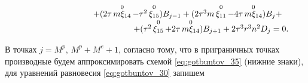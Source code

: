 \begin{equation}
\begin{array}{l}
\hspace{3cm}

+

(2\tau\mathop{m\xi_{14}}\limits^{0}-\tau^2\mathop{\xi_{15}}\limits^{0})B_{j-1}+

(2\tau^3m\mathop{\xi_{11}}\limits^{0}-4\tau\mathop{m\xi_{14}}\limits^{0})B_{j}+

\\

\hspace{4.7cm}

+

(\tau^2\mathop{\xi_{15}}\limits^{0}+2\tau\mathop{m\xi_{14}}\limits^{0})B_{j+1}+2\tau^3r^3n^2D_j=0.

\end{array}

\label{eq:gotbuntov_37} 

\end{equation}

В точках $j=M^p$, $M^p+M^e+1$, согласно тому, что в приграничных точках производные будем аппроксимировать схемой \eqref{eq:gotbuntov_35} (нижние знаки), для уравнений равновесия \eqref{eq:gotbuntov_30} запишем

